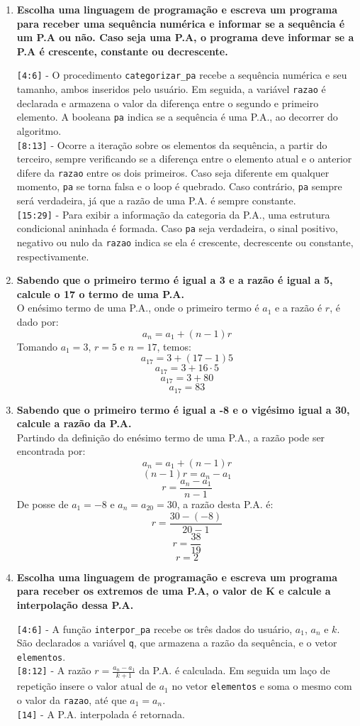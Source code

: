 \begin{enumerate}
	\item \textbf{Escolha uma linguagem de programação e escreva um programa para receber uma sequência numérica e informar se a sequência é um P.A ou não. Caso seja uma P.A, o programa deve informar se a P.A é crescente, constante ou decrescente.}
	
	\verb|[4:6]| - O procedimento \verb|categorizar_pa| recebe a sequência numérica e seu tamanho, ambos inseridos pelo usuário. Em seguida, a variável \verb|razao| é declarada e armazena o valor da diferença entre o segundo e primeiro elemento. A booleana \verb|pa| indica se a sequência é uma P.A., ao decorrer do algoritmo.\\
	\verb|[8:13]| - Ocorre a iteração sobre os elementos da sequência, a partir do terceiro, sempre verificando se a diferença entre o elemento atual e o anterior difere da \verb|razao| entre os dois primeiros. Caso seja diferente em qualquer momento, \verb|pa| se torna falsa e o loop é quebrado. Caso contrário, \verb|pa| sempre será verdadeira, já que a razão de uma P.A. é sempre constante.\\
	\verb|[15:29]| - Para exibir a informação da categoria da P.A., uma estrutura condicional aninhada é formada. Caso \verb|pa| seja verdadeira, o sinal positivo, negativo ou nulo da \verb|razao| indica se ela é crescente, decrescente ou constante, respectivamente.
	
	\item \textbf{Sabendo que o primeiro termo é igual a 3 e a razão é igual a 5, calcule o 17 o termo de uma P.A.}\\
	O enésimo termo de uma P.A., onde o primeiro termo é $a_1$ e a razão é $r$, é dado por:
	$$ a_n = a_1 + (n-1)r $$
	Tomando $a_1 = 3$, $r=5$ e $n=17$, temos:
	$$ a_{17} = 3 + (17-1)5 $$
	$$ a_{17} = 3 + 16 \cdot 5 $$
	$$ a_{17} = 3 + 80 $$
	$$ a_{17} = 83 $$
	
	\item \textbf{Sabendo que o primeiro termo é igual a -8 e o vigésimo igual a 30, calcule a razão da P.A.}\\
	Partindo da definição do enésimo termo de uma P.A., a razão pode ser encontrada por:
	$$ a_n = a_1 + (n-1)r $$
	$$ (n-1)r = a_n - a_1 $$
	$$ r = \frac{a_n - a_1}{n-1} $$
	De posse de $a_1 = -8$ e $a_n = a_{20} = 30$, a razão desta P.A. é:
	$$ r = \frac{30 - (-8)}{20-1} $$
	$$ r = \frac{38}{19} $$
	$$ r = 2 $$
	
	\pagebreak
	\item \textbf{Escolha uma linguagem de programação e escreva um programa para receber os extremos de uma P.A, o valor de K e calcule a interpolação dessa P.A.}
	
	\verb|[4:6]| - A função \verb|interpor_pa| recebe os três dados do usuário, $a_1$, $a_n$ e $k$. São declarados a variável \verb|q|, que armazena a razão da sequência, e o vetor \verb|elementos|.\\
	\verb|[8:12]| - A razão $r = \frac{a_n - a_1}{k+1}$ da P.A. é calculada. Em seguida um laço de repetição insere o valor atual de $a_1$ no vetor \verb|elementos| e soma o mesmo com o valor da \verb|razao|, até que $a_1 = a_n$.\\
	\verb|[14]| - A P.A. interpolada é retornada.
		

\end{enumerate}
